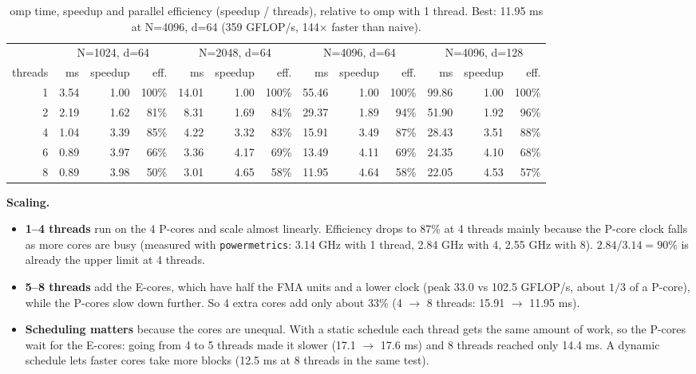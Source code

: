 \documentclass[10pt,a4paper]{article}
\begin{document}
\begin{table}[H]
\centering\footnotesize\setlength{\tabcolsep}{4pt}
\begin{tabular}{@{}r rrr rrr rrr rrr@{}}
\toprule
& \multicolumn{3}{c}{N=1024, d=64} & \multicolumn{3}{c}{N=2048, d=64} & \multicolumn{3}{c}{N=4096, d=64} & \multicolumn{3}{c}{N=4096, d=128} \\
\cmidrule(lr){2-4}\cmidrule(lr){5-7}\cmidrule(lr){8-10}\cmidrule(l){11-13}
threads & ms & speedup & eff. & ms & speedup & eff. & ms & speedup & eff. & ms & speedup & eff. \\
\midrule
1 & 3.54 & 1.00 & 100\% & 14.01 & 1.00 & 100\% & 55.46 & 1.00 & 100\% & 99.86 & 1.00 & 100\% \\
2 & 2.19 & 1.62 & 81\% & 8.31 & 1.69 & 84\% & 29.37 & 1.89 & 94\% & 51.90 & 1.92 & 96\% \\
4 & 1.04 & 3.39 & 85\% & 4.22 & 3.32 & 83\% & 15.91 & 3.49 & 87\% & 28.43 & 3.51 & 88\% \\
6 & 0.89 & 3.97 & 66\% & 3.36 & 4.17 & 69\% & 13.49 & 4.11 & 69\% & 24.35 & 4.10 & 68\% \\
8 & 0.89 & 3.98 & 50\% & 3.01 & 4.65 & 58\% & 11.95 & 4.64 & 58\% & 22.05 & 4.53 & 57\% \\
\bottomrule
\end{tabular}
\caption{omp time, speedup and parallel efficiency (speedup / threads), relative to omp with 1 thread. Best: 11.95 ms at N=4096, d=64 (359 GFLOP/s, 144$\times$ faster than naive).}
\end{table}

\textbf{Scaling.}
\begin{itemize}
\item \textbf{1--4 threads} run on the 4 P-cores and scale almost linearly. Efficiency drops to 87\% at 4 threads mainly because the P-core clock falls as more cores are busy (measured with \texttt{powermetrics}: 3.14 GHz with 1 thread, 2.84 GHz with 4, 2.55 GHz with 8). $2.84/3.14 = 90\%$ is already the upper limit at 4 threads.
\item \textbf{5--8 threads} add the E-cores, which have half the FMA units and a lower clock (peak 33.0 vs 102.5 GFLOP/s, about $1/3$ of a P-core), while the P-cores slow down further. So 4 extra cores add only about 33\% (4 $\rightarrow$ 8 threads: 15.91 $\rightarrow$ 11.95 ms).
\item \textbf{Scheduling matters} because the cores are unequal. With a static schedule each thread gets the same amount of work, so the P-cores wait for the E-cores: going from 4 to 5 threads made it slower (17.1 $\rightarrow$ 17.6 ms) and 8 threads reached only 14.4 ms. A dynamic schedule lets faster cores take more blocks (12.5 ms at 8 threads in the same test).
\end{itemize}
\end{document}
